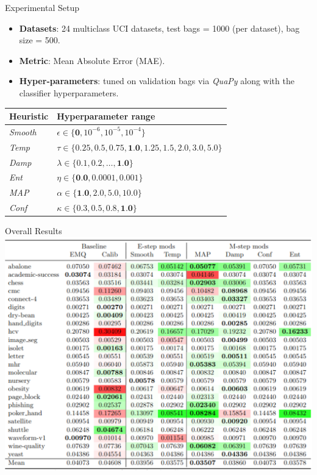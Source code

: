 \documentclass[aspectratio=169]{beamer}
\begin{document}
\begin{frame}{Experimental Setup}
  \begin{itemize}
    \item \textbf{Datasets}: 24 multiclass UCI datasets, test bags = 1000 (per dataset), bag size = 500.
    \item \textbf{Metric}: Mean Absolute Error (MAE).
    \item \textbf{Hyper‑parameters}: tuned on validation bags via \textit{QuaPy} along with the classifier hyperparameters.
  \end{itemize}
  \centering
  \begin{table}[h]
\centering
\label{tab:hyperparams}
\begin{tabular}{ll}
Heuristic & Hyperparameter range\\
\hline
 \textit{Smooth} & $\epsilon \in \{\textbf{0}, 10^{-6}, 10^{-5}, 10^{-4}\}$ \\
\textit{Temp}   & $\tau \in \{0.25, 0.5, 0.75, \textbf{1.0}, 1.25, 1.5, 2.0, 3.0, 5.0\}$ \\
 \textit{Damp}   & $\lambda \in \{0.1, 0.2, \ldots, \textbf{1.0}\}$ \\
 \textit{Ent}    & $\eta \in \{\textbf{0.0}, 0.0001, 0.001\}$ \\
\textit{MAP}    & $\alpha \in \{\textbf{1.0}, 2.0, 5.0, 10.0\}$ \\
\textit{Conf}   & $\kappa \in \{0.3, 0.5, 0.8, \textbf{1.0}\}$ \\
\hline
\end{tabular}
\end{table}
\end{frame}


\begin{frame}{Overall Results}
  \centering
  \includegraphics[width=0.6\linewidth]{images/results_lr.png}
\end{frame}
\end{document}
